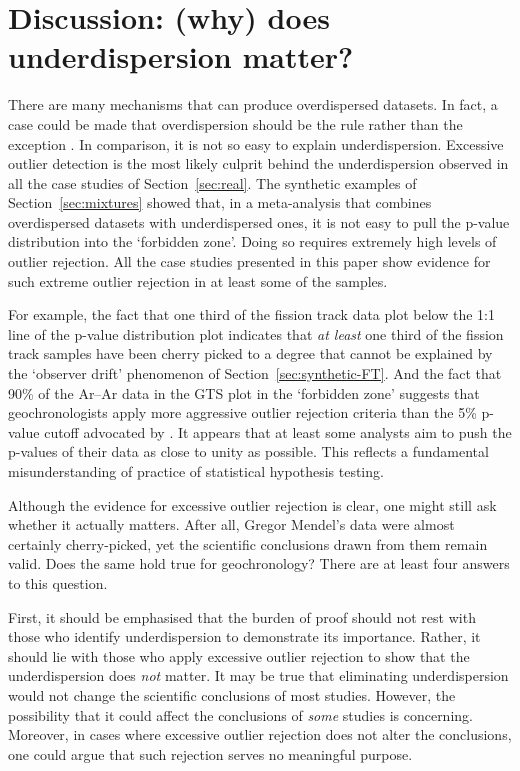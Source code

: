 \documentclass[gchron, manuscript]{copernicus}
\begin{document}
\section{Discussion: (why) does underdispersion matter?}\label{sec:importance}

There are many mechanisms that can produce overdispersed datasets. In
fact, a case could be made that overdispersion should be the rule
rather than the exception \citep{kalsbeek1992,vermeesch2025c}.  In
comparison, it is not so easy to explain underdispersion.  Excessive
outlier detection is the most likely culprit behind the
underdispersion observed in all the case studies of
Section~\ref{sec:real}. The synthetic examples of
Section~\ref{sec:mixtures} showed that, in a meta-analysis that
combines overdispersed datasets with underdispersed ones, it is not
easy to pull the p-value distribution into the `forbidden zone'.
Doing so requires extremely high levels of outlier rejection. All the
case studies presented in this paper show evidence for such extreme
outlier rejection in at least some of the samples.\medskip

For example, the fact that one third of the fission track data plot
below the 1:1 line of the p-value distribution plot indicates that
\emph{at least} one third of the fission track samples have been
cherry picked to a degree that cannot be explained by the `observer
drift' phenomenon of Section~\ref{sec:synthetic-FT}.  And the fact
that 90\% of the Ar--Ar data in the GTS plot in the `forbidden zone'
suggests that geochronologists apply more aggressive outlier rejection
criteria than the 5\% p-value cutoff advocated by
\citet{jourdan2009}. It appears that at least some analysts aim to
push the p-values of their data as close to unity as possible.  This
reflects a fundamental misunderstanding of practice of statistical
hypothesis testing.\medskip

Although the evidence for excessive outlier rejection is clear, one
might still ask whether it actually matters. After all, Gregor
Mendel's data were almost certainly cherry-picked, yet the scientific
conclusions drawn from them remain valid. Does the same hold true for
geochronology? There are at least four answers to this
question.\medskip

First, it should be emphasised that the burden of proof should not
rest with those who identify underdispersion to demonstrate its
importance. Rather, it should lie with those who apply excessive
outlier rejection to show that the underdispersion does \emph{not}
matter. It may be true that eliminating underdispersion would not
change the scientific conclusions of most studies. However, the
possibility that it could affect the conclusions of \emph{some}
studies is concerning. Moreover, in cases where excessive outlier
rejection does not alter the conclusions, one could argue that such
rejection serves no meaningful purpose.\medskip
\end{document}
